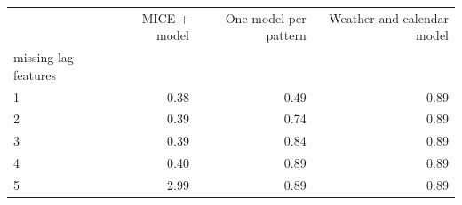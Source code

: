 \begin{tabular}{lrrr}
\toprule
 & MICE + model & One model per pattern & Weather and calendar model \\
missing lag features &  &  &  \\
\midrule
1 & 0.38 & 0.49 & 0.89 \\
2 & 0.39 & 0.74 & 0.89 \\
3 & 0.39 & 0.84 & 0.89 \\
4 & 0.40 & 0.89 & 0.89 \\
5 & 2.99 & 0.89 & 0.89 \\
\bottomrule
\end{tabular}
